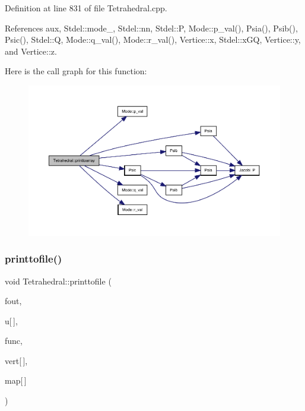 Definition at line 831 of file Tetrahedral.\+cpp.



References aux, Stdel\+::mode\+\_\+, Stdel\+::nn, Stdel\+::P, Mode\+::p\+\_\+val(), Psia(), Psib(), Psic(), Stdel\+::Q, Mode\+::q\+\_\+val(), Mode\+::r\+\_\+val(), Vertice\+::x, Stdel\+::x\+GQ, Vertice\+::y, and Vertice\+::z.

Here is the call graph for this function\+:
\nopagebreak
\begin{figure}[H]
\begin{center}
\leavevmode
\includegraphics[width=350pt]{classTetrahedral_a6d77895bb1de878cf21430c3ad6ee5fc_cgraph}
\end{center}
\end{figure}
\mbox{\label{classTetrahedral_a1ebce59e415a8c8fa52b453439fc06ee}} 
\subsubsection{\texorpdfstring{printtofile()}{printtofile()}\hspace{0.1cm}{\footnotesize\ttfamily [1/2]}}
{\footnotesize\ttfamily void Tetrahedral\+::printtofile (\begin{DoxyParamCaption}\item[{F\+I\+LE $\ast$}]{fout,  }\item[{const double}]{u\mbox{[}$\,$\mbox{]},  }\item[{double($\ast$)(double, double, double)}]{func,  }\item[{const \hyperlink{structVertice}{Vertice}}]{vert\mbox{[}$\,$\mbox{]},  }\item[{const int}]{map\mbox{[}$\,$\mbox{]} }\end{DoxyParamCaption})\hspace{0.3cm}{\ttfamily [virtual]}}



